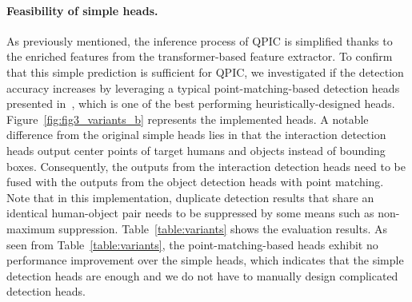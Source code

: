 \documentclass[final]{cvpr}
\begin{document}
\paragraph{Feasibility of simple heads.}
As previously mentioned, the inference process of QPIC is simplified thanks to the enriched features from the transformer-based feature extractor. 
To confirm that this simple prediction is sufficient for QPIC, we investigated if the detection accuracy increases by leveraging a typical point-matching-based detection heads presented in~\cite{liao_cvpr2020}, which is one of the best performing heuristically-designed heads. 
Figure~\ref{fig:fig3_variants_b} represents the implemented heads. 
A notable difference from the original simple heads lies in that the interaction detection heads output center points of target humans and objects instead of bounding boxes. Consequently, the outputs from the interaction detection heads need to be fused with the outputs from the object detection heads with point matching. 
Note that in this implementation, duplicate detection results that share an identical human-object pair needs to be suppressed by some means such as non-maximum suppression. 
Table~\ref{table:variants} shows the evaluation results. 
As seen from Table~\ref{table:variants}, the point-matching-based heads exhibit no performance improvement over the simple heads, which indicates that the simple detection heads are enough and we do not have to manually design complicated detection heads.

\vspace{-2.0ex}
\end{document}
